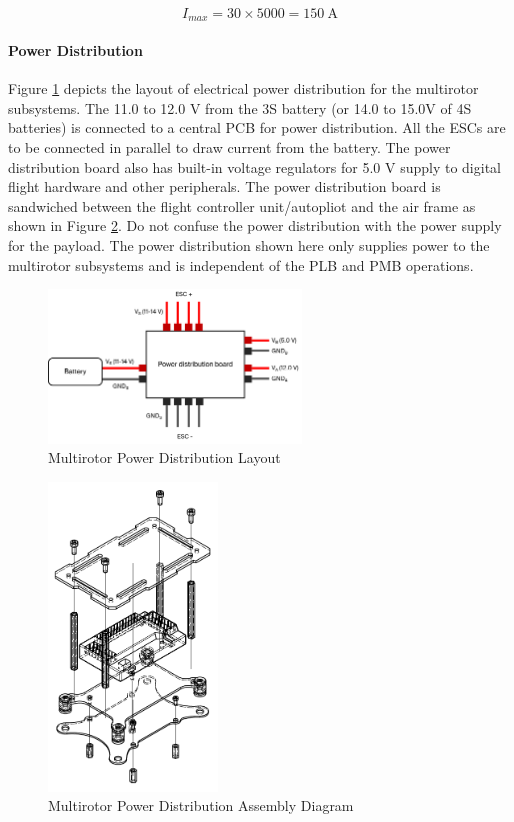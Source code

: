 $$
I_{max}=30 \times 5000 = 150~\text{A}
$$

\paragraph{Power Distribution}

Figure \ref{fig:pdb} depicts the layout of electrical power distribution for the multirotor subsystems. The 11.0 to 12.0 V from the 3S battery (or 14.0 to 15.0V of 4S batteries) is connected to a central PCB for power distribution. All the ESCs are to be connected in parallel to draw current from the battery. The power distribution board also has built-in voltage regulators for 5.0 V supply to digital flight hardware and other peripherals. The power distribution board is sandwiched between the flight controller unit/autopliot and the air frame as shown in Figure \ref{fig:pdb2}. Do not confuse the power distribution with the power supply for the payload. The power distribution shown here only supplies power to the multirotor subsystems and is independent of the PLB and PMB operations.

\begin{figure}[h]
    \centering
    \includegraphics[width=0.6\textwidth]{img/pdb}
    \caption{Multirotor Power Distribution Layout}
    \label{fig:pdb}
\end{figure}

\begin{figure}[h]
    \centering
    \includegraphics[width=0.4\textwidth]{img/pdb2}
    \caption{Multirotor Power Distribution Assembly Diagram}
    \label{fig:pdb2}
\end{figure}

